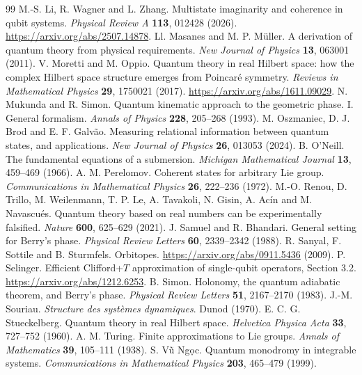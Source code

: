 \documentclass[11pt,a4paper]{article}
\begin{document}
\begin{thebibliography}{99}
 M.-S. Li, R. Wagner and L. Zhang. Multistate imaginarity and coherence in qubit systems. \emph{Physical Review A} \textbf{113}, 012428 (2026). \url{https://arxiv.org/abs/2507.14878}.
 Ll. Masanes and M. P. M\"uller. A derivation of quantum theory from physical requirements. \emph{New Journal of Physics} \textbf{13}, 063001 (2011).
 V. Moretti and M. Oppio. Quantum theory in real Hilbert space: how the complex Hilbert space structure emerges from Poincar\'e symmetry. \emph{Reviews in Mathematical Physics} \textbf{29}, 1750021 (2017). \url{https://arxiv.org/abs/1611.09029}.
 N. Mukunda and R. Simon. Quantum kinematic approach to the geometric phase. I. General formalism. \emph{Annals of Physics} \textbf{228}, 205--268 (1993).
 M. Oszmaniec, D. J. Brod and E. F. Galv\~ao. Measuring relational information between quantum states, and applications. \emph{New Journal of Physics} \textbf{26}, 013053 (2024).
 B. O'Neill. The fundamental equations of a submersion. \emph{Michigan Mathematical Journal} \textbf{13}, 459--469 (1966).
 A. M. Perelomov. Coherent states for arbitrary Lie group. \emph{Communications in Mathematical Physics} \textbf{26}, 222--236 (1972).
 M.-O. Renou, D. Trillo, M. Weilenmann, T. P. Le, A. Tavakoli, N. Gisin, A. Ac\'in and M. Navascu\'es. Quantum theory based on real numbers can be experimentally falsified. \emph{Nature} \textbf{600}, 625--629 (2021).
 J. Samuel and R. Bhandari. General setting for Berry's phase. \emph{Physical Review Letters} \textbf{60}, 2339--2342 (1988).
 R. Sanyal, F. Sottile and B. Sturmfels. Orbitopes. \url{https://arxiv.org/abs/0911.5436} (2009).
 P. Selinger. Efficient Clifford+$T$ approximation of single-qubit operators, Section 3.2. \url{https://arxiv.org/abs/1212.6253}.
 B. Simon. Holonomy, the quantum adiabatic theorem, and Berry's phase. \emph{Physical Review Letters} \textbf{51}, 2167--2170 (1983).
 J.-M. Souriau. \emph{Structure des syst\`emes dynamiques}. Dunod (1970).
 E. C. G. Stueckelberg. Quantum theory in real Hilbert space. \emph{Helvetica Physica Acta} \textbf{33}, 727--752 (1960).
 A. M. Turing. Finite approximations to Lie groups. \emph{Annals of Mathematics} \textbf{39}, 105--111 (1938).
 S. V\~u Ng\d{o}c. Quantum monodromy in integrable systems. \emph{Communications in Mathematical Physics} \textbf{203}, 465--479 (1999).
\end{thebibliography}
\end{document}
